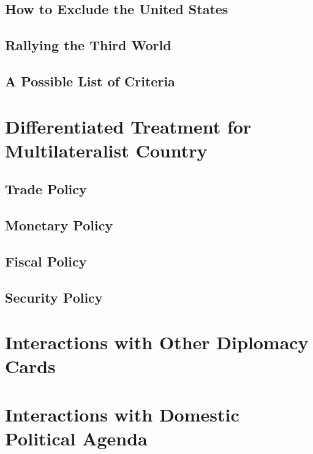 \subsection{How to Exclude the United States}
\subsection{Rallying the Third World}
\subsection{A Possible List of Criteria}
\section{Differentiated Treatment for Multilateralist Country}
\subsection{Trade Policy}
\subsection{Monetary Policy}
\subsection{Fiscal Policy}
\subsection{Security Policy}
\section{Interactions with Other Diplomacy Cards}
\section{Interactions with Domestic Political Agenda}


